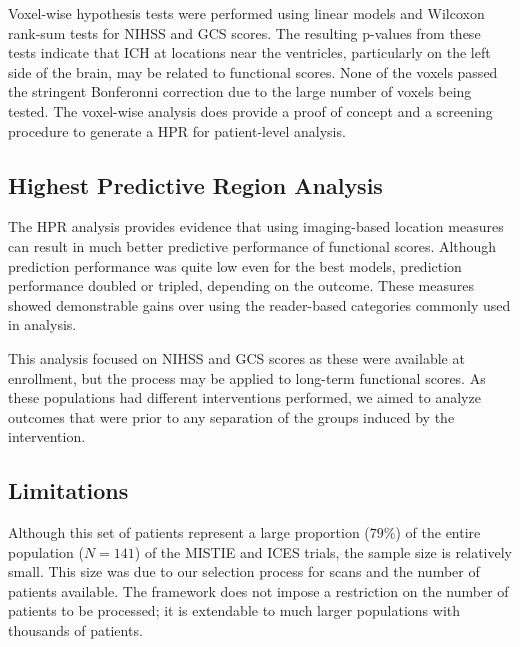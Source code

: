 \documentclass[10pt]{article}\usepackage[]{graphicx}\usepackage[]{color}
\begin{document}
Voxel-wise hypothesis tests were performed using linear models and Wilcoxon rank-sum tests for NIHSS and GCS scores.  The resulting p-values from these tests indicate that ICH at locations near the ventricles, particularly on the left side of the brain, may be related to functional scores.  
None of the voxels passed the stringent  Bonferonni correction due to the large number of voxels being tested. The voxel-wise analysis does provide a proof of concept and a screening procedure to generate a HPR for patient-level analysis.

\subsection{Highest Predictive Region Analysis}

The HPR analysis provides evidence that using imaging-based location measures can result in much better predictive performance of functional scores.  Although prediction performance was quite low even for the best models, prediction performance doubled or tripled, depending on the outcome.  These measures showed demonstrable gains over using the reader-based categories commonly used in analysis.

This analysis focused on NIHSS and GCS scores as these were available at enrollment, but the process may be applied to long-term functional scores.  As these populations had different interventions performed, we aimed to analyze outcomes that were prior to any separation of the groups induced by the intervention.  

\subsection{Limitations}

Although this set of patients represent a large proportion ($79$\%) of the entire population ($N=141$) of the MISTIE and ICES trials, the sample size is relatively small.  This size was due to our selection process for scans and the number of patients available.  The framework does not impose a restriction on the number of patients to be processed; it is extendable to much larger populations with thousands of patients.
\end{document}
